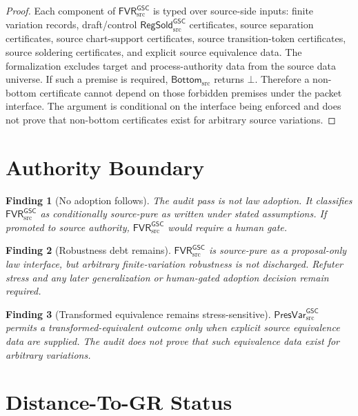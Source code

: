 \documentclass[11pt]{article}
\newcommand{\RegSold}{\mathsf{RegSold}_{\mathrm{src}}^{\mathsf{GSC}}}
\newcommand{\FVR}{\mathsf{FVR}_{\mathrm{src}}^{\mathsf{GSC}}}
\newcommand{\PresVar}{\mathsf{PresVar}_{\mathrm{src}}^{\mathsf{GSC}}}
\newcommand{\BottomSrc}{\mathsf{Bottom}_{\mathrm{src}}}
\newcommand{\Bot}{\bot}
\newtheorem{finding}{Finding}
\begin{document}
\begin{proof}
Each component of \(\FVR\) is typed over source-side inputs: finite variation
records, draft/control \(\RegSold\) certificates, source separation
certificates, source chart-support certificates, source transition-token
certificates, source soldering certificates, and explicit source equivalence
data. The formalization excludes target and process-authority data from the
source data universe. If such a premise is required, \(\BottomSrc\) returns
\(\Bot\). Therefore a non-bottom certificate cannot depend on those forbidden
premises under the packet interface. The argument is conditional on the
interface being enforced and does not prove that non-bottom certificates exist
for arbitrary source variations.
\end{proof}

\section{Authority Boundary}

\begin{finding}[No adoption follows]
The audit pass is not law adoption. It classifies \(\FVR\) as conditionally
source-pure as written under stated assumptions. If promoted to source
authority, \(\FVR\) would require a human gate.
\end{finding}

\begin{finding}[Robustness debt remains]
\(\FVR\) is source-pure as a proposal-only law interface, but arbitrary
finite-variation robustness is not discharged. Refuter stress and any later
generalization or human-gated adoption decision remain required.
\end{finding}

\begin{finding}[Transformed equivalence remains stress-sensitive]
\(\PresVar\) permits a transformed-equivalent outcome only when explicit
source equivalence data are supplied. The audit does not prove that such
equivalence data exist for arbitrary variations.
\end{finding}

\section{Distance-To-GR Status}
\end{document}
